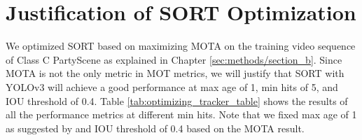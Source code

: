 \section{Justification of SORT Optimization}
\label{sec:appendix/section_a}

We optimized SORT based on maximizing MOTA on the training video sequence of Class C PartyScene as explained in Chapter \ref{sec:methods/section_b}. Since MOTA is not the only metric in MOT metrics, we will justify that SORT with YOLOv3 will achieve a good performance at max age of 1, min hits of 5, and IOU threshold of 0.4. Table \ref{tab:optimizing_tracker_table} shows the results of all the performance metrics at different min hits. Note that we fixed max age of 1 as suggested by \cite{abewley_abewleysort_2021} and IOU threshold of 0.4 based on the MOTA result.
